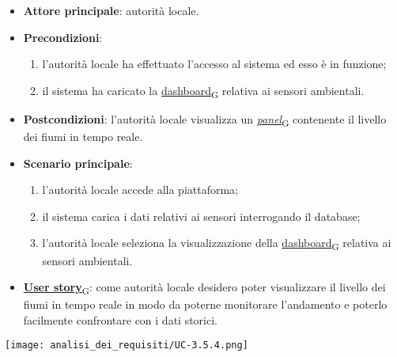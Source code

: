 \begin{itemize}
	\item \textbf{Attore principale}: autorità locale.
	\item \textbf{Precondizioni}:
	      \begin{enumerate}
		      \item l'autorità locale ha effettuato l'accesso al sistema ed esso è in funzione;
		      \item il sistema ha caricato la \href{https://7last.github.io/docs/pb/documentazione-interna/glossario\#dashboard}{dashboard\textsubscript{G}} relativa ai sensori ambientali.
	      \end{enumerate}
	\item \textbf{Postcondizioni}: l'autorità locale visualizza un \href{https://7last.github.io/docs/pb/documentazione-interna/glossario\#panel}{\textit{panel}\textsubscript{G}} contenente il livello dei fiumi in tempo reale.
	\item \textbf{Scenario principale}:
	      \begin{enumerate}
		      \item l'autorità locale accede alla piattaforma;
		      \item il sistema carica i dati relativi ai sensori interrogando il database;
		      \item l'autorità locale seleziona la visualizzazione della \href{https://7last.github.io/docs/pb/documentazione-interna/glossario\#dashboard}{dashboard\textsubscript{G}} relativa ai sensori ambientali.
	      \end{enumerate}
	\item \href{https://7last.github.io/docs/pb/documentazione-interna/glossario\#user-story}{\textbf{User story}\textsubscript{G}}:
	      come autorità locale desidero poter visualizzare il livello dei fiumi in tempo reale in modo da poterne monitorare l'andamento
	      e poterlo facilmente confrontare con i dati storici.
\end{itemize}
\begin{center}
	\texttt{[image: analisi\_dei\_requisiti/UC-3.5.4.png]}
\end{center}



